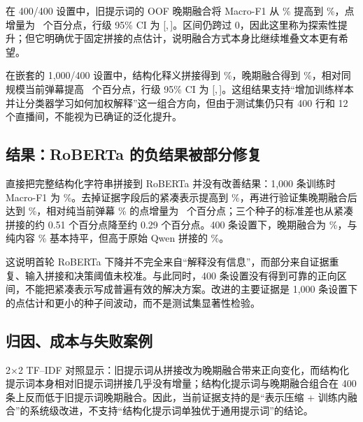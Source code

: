 \documentclass[UTF8,zihao=-4,a4paper]{ctexart}
\begin{document}
在 400/400 设置中，旧提示词的 OOF 晚期融合将 Macro-F1 从 \ImproveTFIDFSmallContent\% 提高到 \ImproveTFIDFSmallOldLate\%，点增量为 \ImproveTFIDFSmallOldLateDeltaPP\ 个百分点，行级 95\% CI 为 [\ImproveTFIDFSmallOldLateLowPP,\,\ImproveTFIDFSmallOldLateHighPP]。区间仍跨过 0，因此这里称为探索性提升；但它明确优于固定拼接的点估计，说明融合方式本身比继续堆叠文本更有希望。

在嵌套的 1,000/400 设置中，结构化释义拼接得到 \ImproveTFIDFLargeStructuredConcat\%，晚期融合得到 \ImproveTFIDFLargeStructuredLate\%，相对同规模当前弹幕提高 \ImproveTFIDFLargeLateDeltaPP\ 个百分点，行级 95\% CI 为 [\ImproveTFIDFLargeLateLowPP,\,\ImproveTFIDFLargeLateHighPP]。这组结果支持“增加训练样本并让分类器学习如何加权解释”这一组合方向，但由于测试集仍只有 400 行和 12 个直播间，不能视为已确证的泛化提升。

\subsection{结果：RoBERTa 的负结果被部分修复}

直接把完整结构化字符串拼接到 RoBERTa 并没有改善结果：1,000 条训练时 Macro-F1 为 \ImproveRobertaLargeStructured\%。去掉证据字段后的紧凑表示提高到 \ImproveRobertaLargeCompact\%，再进行验证集晚期融合后达到 \ImproveRobertaLargeLateFusion\%，相对纯当前弹幕 \ImproveRobertaLargeContent\% 的点增量为 \ImproveRobertaLargeLateDeltaPP\ 个百分点；三个种子的标准差也从紧凑拼接的约 0.51 个百分点降至约 0.29 个百分点。400 条设置下，晚期融合为 \ImproveRobertaSmallLateFusion\%，与纯内容 \ImproveRobertaSmallContent\% 基本持平，但高于原始 Qwen 拼接的 \ImproveRobertaSmallOldQwen\%。

这说明首轮 RoBERTa 下降并不完全来自“解释没有信息”，而部分来自证据重复、输入拼接和决策阈值未校准。与此同时，400 条设置没有得到可靠的正向区间，不能把紧凑表示写成普遍有效的解决方案。改进的主要证据是 1,000 条设置下的点估计和更小的种子间波动，而不是测试集显著性检验。

\begin{table}[H]
\centering
\small
\caption{RoBERTa 紧凑表示与验证集晚期融合结果（mean$\pm$SD，\%）。}
\label{tab:improvement-roberta}

\end{table}

\subsection{归因、成本与失败案例}

2$\times$2 TF--IDF 对照显示：旧提示词从拼接改为晚期融合带来正向变化，而结构化提示词本身相对旧提示词拼接几乎没有增量；结构化提示词与晚期融合组合在 400 条上反而低于旧提示词晚期融合。因此，当前证据支持的是“表示压缩 + 训练内融合”的系统级改进，不支持“结构化提示词单独优于通用提示词”的结论。
\end{document}
